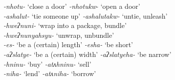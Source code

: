 \documentclass[output=paper,colorlinks,citecolor=brown]{langscibook}
\begin{document}

\TabPositions{5cm}%
\ea\label{oneida:deriv rev}
    \ea
        \textit{-nhotu-}  `close a door'	\tab \textit{-nhotukw}-	`open a door' \\
        \textit{-ashalut-} `tie someone up'    \tab \textit{-ashalutakw-} `untie, unleash' \\
        \textit{-hweʔnuni-} `wrap into a package, bundle' \\
                                            \tab \textit{-hweʔnunyahsyu-}  `unwrap, unbundle' \\
    \ex
        \textit{-es-} `be a (certain) length' \tab \textit{-esha-} `be short' \\
        \textit{-aʔslatye-} `be a (certain) width' \tab \textit{-aʔslatyeha-} `be narrow' \\
    \ex
        \textit{-hninu-} `buy' \tab \textit{-atʌhninu-} `sell' \\
        \textit{-niha-} `lend' \tab	\textit{-atʌniha-} `borrow' \\
    \z
\z
\end{document}
